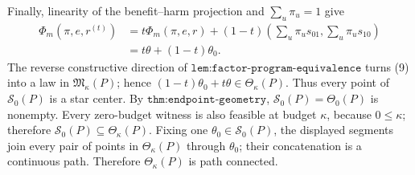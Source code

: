 Finally, linearity of the benefit--harm projection and \(\sum_u\pi_u=1\) give
\[
\begin{aligned}
\Phi_m(\pi,e,r^{(t)})
&=t\Phi_m(\pi,e,r)
 +(1-t)\left(\sum_u\pi_us_{01},\sum_u\pi_us_{10}\right)\\
&=t\theta+(1-t)\theta_0.
\end{aligned}
\tag{9}
\]
The reverse constructive direction of \(\texttt{lem:factor-program-equivalence}\) turns (9) into a law in \(\mathfrak M_\kappa(P)\); hence \((1-t)\theta_0+t\theta\in\Theta_\kappa(P)\).  Thus every point of \(\mathcal S_0(P)\) is a star center.  By \(\texttt{thm:endpoint-geometry}\), \(\mathcal S_0(P)=\Theta_0(P)\) is nonempty.  Every zero-budget witness is also feasible at budget \(\kappa\), because \(0\leq\kappa\); therefore \(\mathcal S_0(P)\subseteq\Theta_\kappa(P)\).  Fixing one \(\theta_0\in\mathcal S_0(P)\), the displayed segments join every pair of points in \(\Theta_\kappa(P)\) through \(\theta_0\); their concatenation is a continuous path.  Therefore \(\Theta_\kappa(P)\) is path connected.